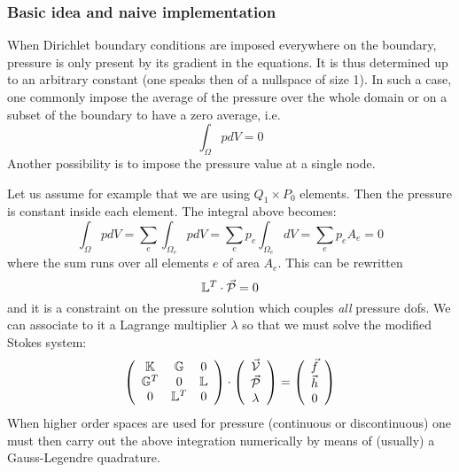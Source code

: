 
\subsubsection{Basic idea and naive implementation}

When Dirichlet boundary conditions are imposed everywhere on the boundary, 
pressure is only present by its gradient in 
the equations. It is thus determined up to an arbitrary constant (one speaks then 
of a nullspace of size 1).  
In such a case, one commonly impose the average of the pressure over the whole domain or on 
a subset of the boundary 
to have a zero average, i.e.
\begin{equation}
\int_\Omega p dV = 0
\end{equation}
Another possibility is to impose the pressure value at a single node. 

Let us assume for example that we are using $Q_1 \times P_0$ elements. Then the pressure is constant 
inside each element. 
The integral above becomes:
\begin{equation}
\int_\Omega p dV = 
\sum_e  \int_{\Omega_e} p dV = 
\sum_e  p_e \int_{\Omega_e} dV = 
\sum_e  p_e A_e = 0
\end{equation}
where the sum runs over all elements $e$ of area $A_e$.
This can be rewritten 
\[
{\mathbb{L}}^T \cdot \vec{\cal P}=0
\] 
and it is a constraint on the pressure solution which couples {\it all} pressure dofs. 
We can associate to it a Lagrange multiplier $\lambda$ so that we must solve the modified Stokes system:
\[
\left(
\begin{array}{ccc}
{\mathbb{K}} & {\mathbb{G}} & 0\\ 
{\mathbb{G}}^T & 0 & {\mathbb{L}} \\
0 & {\mathbb{L}}^T & 0
\end{array}
\right)
\cdot
\left(
\begin{array}{c}
\vec{\cal V} \\ \vec{\cal P} \\ \lambda
\end{array}
\right)
=
\left(
\begin{array}{c}
\vec{f} \\ \vec{h} \\ 0
\end{array}
\right)
\]
When higher order spaces are used for pressure (continuous or discontinuous)
one must then carry out the above integration numerically by means of (usually)
a Gauss-Legendre quadrature.

